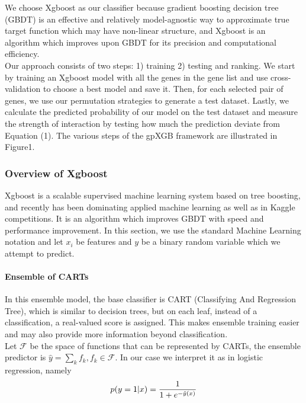 \documentclass[11pt]{article}
\theoremstyle{plain}
\theoremstyle{definition}
\theoremstyle{remark}
\begin{document}
We choose Xgboost as our classifier because gradient boosting decision tree (GBDT) is an effective and relatively model-agnostic way to approximate true target function which may have non-linear structure, and Xgboost is an algorithm which improves upon GBDT for its precision and computational efficiency.\\

Our approach consists of two steps: 1) training 2) testing and ranking. We start by training an Xgboost model with all the genes in the gene list and use cross-validation to choose a best model and save it. Then, for each selected pair of genes, we use our permutation strategies to generate a test dataset. Lastly, we calculate the predicted probability of our model on the test dataset and measure the strength of interaction by testing how much the prediction deviate from Equation (1). The various steps of the gpXGB framework are illustrated in Figure1.

\subsubsection{Overview of Xgboost}

Xgboost \cite{9} is a scalable supervised machine learning system based on tree boosting, and recently has been dominating applied machine learning as well as in Kaggle competitions. It is an algorithm which improves GBDT with speed and performance improvement. In this section, we use the standard Machine Learning notation and let $x_i$ be features and $y$ be a binary random variable which we attempt to predict.

\paragraph{Ensemble of CARTs}
In this ensemble model, the base classifier is CART (Classifying And Regression Tree), which is similar to decision trees, but on each leaf, instead of a classification, a real-valued score is assigned. This makes ensemble training easier and may also provide more information beyond classification.\\

Let $\mathcal{F}$ be the space of functions that can be represented by CARTs, the ensemble predictor is $\hat{y}=\sum_k f_k, f_k\in\mathcal{F}$. In our case we interpret it as in logistic regression, namely
\begin{equation}
p(y=1|x)={1\over 1+e^{-\hat{y}(x)}}
\end{equation}
\end{document}
